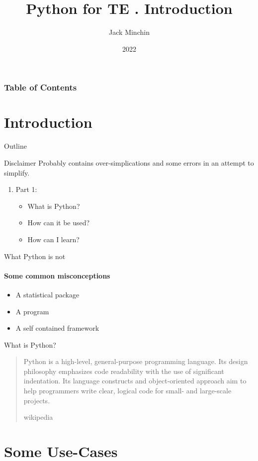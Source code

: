 \documentclass[aspectratio=169]{beamer}
\title{\large{\textbf{Python for TE}} \newline\newline 1. Introduction}
\author{Jack Minchin}
\institute{Tourism Economics}
\date{2022}
\begin{document}
\frame{\titlepage}

\begin{frame}
\frametitle{Table of Contents}
\tableofcontents
\end{frame}

\section{Introduction}

\begin{frame}{Outline}
	\begin{block}{Disclaimer}
		Probably contains over-simplications and some errors in an attempt to simplify.
	\end{block}

	\begin{enumerate}
		\item Part 1:
		\begin{itemize}
			\item What is Python?
			\item How can it be used?
			\item How can I learn?
		\end{itemize}

	\end{enumerate}
\end{frame}


\begin{frame}{What Python is not}
\framesubtitle{Some common misconceptions}

\begin{itemize}
	\item A statistical package
	\item A program
	\item A self contained framework
\end{itemize}

\end{frame}


\begin{frame}{What is Python?}
\blockquote[wikipedia]{
	Python is a high-level, general-purpose programming language. Its design philosophy emphasizes code readability with the use of significant indentation. Its language constructs and object-oriented approach aim to help programmers write clear, logical code for small- and large-scale projects.}
\end{frame}

\section{Some Use-Cases}
\end{document}

